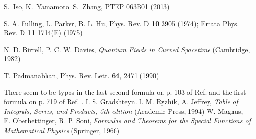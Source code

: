 \documentclass[aps,prd,preprintnumbers,nofootinbib,showpacs]{revtex4}%
\begin{document}
\begin{widetext}
\begin{thebibliography}{99}
S.~Iso, K.~Yamamoto, S.~Zhang, PTEP 063B01 (2013)

S. A. Fulling, L. Parker, B. L. Hu, Phys. Rev. D {\bf 10} 3905 (1974); Errata Phys. Rev. D {\bf 11} 1714(E) (1975)

N. D. Birrell, P. C. W. Davies, {\it Quantum Fields in Curved Spacetime} (Cambridge, 1982)

T. Padmanabhan, Phys. Rev. Lett. {\bf 64}, 2471 (1990)

There seem to be typos in the last second formula on p. 103 of Ref. \cite{Magnus} and the first formula 
on p. 719 of Ref. \cite{Tables}. 
I. S. Gradshteyn. I. M. Ryzhik, A. Jeffrey, {\it Table of Integrals, Series, and Products, 5th edition} (Academic Press, 1994)
W. Magnus, F. Oberhettinger, R. P. Soni, {\it Formulas and Theorems for the Special Functions of Mathematical Physics} (Springer, 1966)


\end{thebibliography}


\end{widetext}
\end{document}
